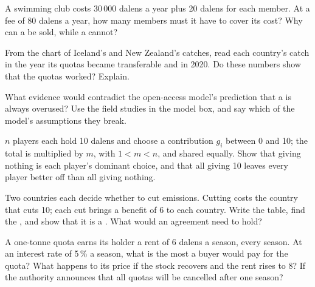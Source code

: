 \begin{exercise}[$\star\star$]\label{exo:g11:public-goods-and-commons:10}
A swimming club costs 30\,000 dalens a year plus 20 dalens for each member. At a fee of 80 dalens a year, how many members must it have to cover its cost? Why can a
 be sold, while a  cannot?
\end{exercise}

\begin{exercise}[$\star\star$]\label{exo:g11:public-goods-and-commons:11}
From the chart of Iceland's and New Zealand's catches, read each country's catch in the year its quotas became transferable and in 2020. Do these numbers show that the
quotas worked? Explain.
\end{exercise}

\begin{exercise}[$\star\star\star$]\label{exo:g11:public-goods-and-commons:12}
What evidence would contradict the open-access model's prediction that a  is always overused? Use the field studies in the model box, and say which of the
model's assumptions they break.
\end{exercise}

\begin{exercise}[$\star\star\star$]\label{exo:g11:public-goods-and-commons:13}
$n$ players each hold 10 dalens and choose a contribution $g_i$ between 0 and 10; the total is multiplied by $m$, with $1 < m < n$, and shared equally. Show that giving
nothing is each player's dominant choice, and that all giving 10 leaves every player better off than all giving nothing.
\end{exercise}

\begin{exercise}[$\star\star\star$]\label{exo:g11:public-goods-and-commons:14}
Two countries each decide whether to cut emissions. Cutting costs the country that cuts 10; each cut brings a benefit of 6 to each country. Write the  table,
find the , and show that it is a . What would an agreement need to hold?
\end{exercise}

\begin{exercise}[$\star\star\star$]\label{exo:g11:public-goods-and-commons:15}
A one-tonne quota earns its holder a rent of 6 dalens a season, every season. At an interest rate of 5\,\% a season, what is the most a buyer would pay for the quota?
What happens to its price if the stock recovers and the rent rises to 8? If the authority announces that all quotas will be cancelled after one season?
\end{exercise}

